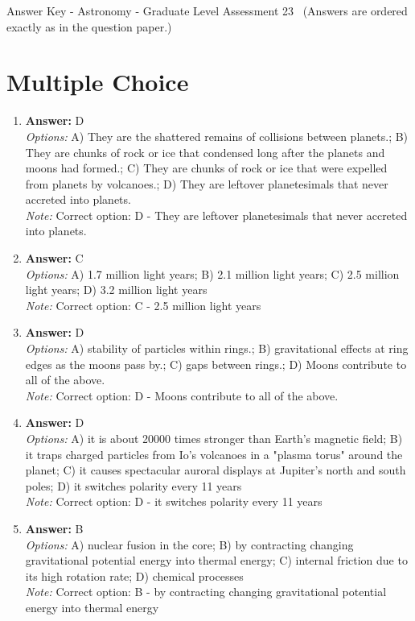 \documentclass[12pt]{article}
\begin{document}
\begin{center}
Answer Key - Astronomy - Graduate Level Assessment 23 \
\small (Answers are ordered exactly as in the question paper.)
\end{center}

\section*{Multiple Choice}
\begin{enumerate}[label=\arabic*.]
\item \textbf{Answer:} D
\\ \textit{Options:} A) They are the shattered remains of collisions between planets.; B) They are chunks of rock or ice that condensed long after the planets and moons had formed.; C) They are chunks of rock or ice that were expelled from planets by volcanoes.; D) They are leftover planetesimals that never accreted into planets.
\\ \textit{Note:} Correct option: D - They are leftover planetesimals that never accreted into planets.
\item \textbf{Answer:} C
\\ \textit{Options:} A) 1.7 million light years; B) 2.1 million light years; C) 2.5 million light years; D) 3.2 million light years
\\ \textit{Note:} Correct option: C - 2.5 million light years
\item \textbf{Answer:} D
\\ \textit{Options:} A) stability of particles within rings.; B) gravitational effects at ring edges as the moons pass by.; C) gaps between rings.; D) Moons contribute to all of the above.
\\ \textit{Note:} Correct option: D - Moons contribute to all of the above.
\item \textbf{Answer:} D
\\ \textit{Options:} A) it is about 20000 times stronger than Earth's magnetic field; B) it traps charged particles from Io's volcanoes in a "plasma torus" around the planet; C) it causes spectacular auroral displays at Jupiter's north and south poles; D) it switches polarity every 11 years
\\ \textit{Note:} Correct option: D - it switches polarity every 11 years
\item \textbf{Answer:} B
\\ \textit{Options:} A) nuclear fusion in the core; B) by contracting changing gravitational potential energy into thermal energy; C) internal friction due to its high rotation rate; D) chemical processes
\\ \textit{Note:} Correct option: B - by contracting changing gravitational potential energy into thermal energy
\end{enumerate}
\end{document}

